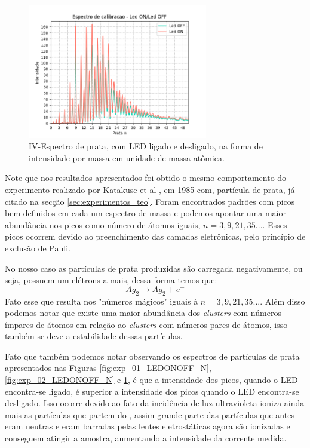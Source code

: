 \begin{figure}
  \centering  
  \includegraphics[width=0.7\textwidth]{exp_04/LED_ON_Led_OFF_espectro_calib_prata_N_.png}
  \caption{IV-Espectro de prata, com LED ligado e desligado, na forma de intensidade por massa em unidade de massa atômica.}
  \label{fig:exp_04_LEDONOFF_N}
\end{figure}

Note que nos resultados apresentados foi obtido o mesmo comportamento do experimento realizado por Katakuse et al \cite{KATAKUSE1985229}, em 1985 com, partícula de prata, já citado na secção \ref{sec:experimentos_teo}. Foram encontrados padrões com picos bem definidos em cada um espectro de massa e podemos apontar uma maior  abundância nos picos como número de átomos iguais, $n= 3,9,21,35...$. Esses picos ocorrem devido ao preenchimento das camadas eletrônicas, pelo princípio de exclusão de Pauli.

 No nosso caso as partículas de prata produzidas são carregada negativamente, ou seja, possuem um elétrons a mais, dessa forma temos que:
  \begin{equation*}
    Ag_{2} \to Ag_{2} + e^{-}
\end{equation*} 
 Fato esse que resulta nos "números mágicos" iguais à $n= 3,9,21,35...$. Além disso podemos notar que existe uma maior abundância dos \textit{clusters} com números ímpares de átomos em relação ao \textit{clusters} com números pares de átomos, isso também se deve a estabilidade dessas partículas.
 
 Fato que também podemos notar observando os espectros de partículas de prata apresentados nas Figuras \ref{fig:exp_01_LEDONOFF_N}, \ref{fig:exp_02_LEDONOFF_N} e \ref{fig:exp_04_LEDONOFF_N}, é que a intensidade dos picos, quando o LED encontra-se ligado, é superior a intensidade dos picos quando o LED encontra-se desligado. Isso ocorre devido ao fato da incidência de luz ultravioleta ioniza ainda mais as partículas que partem do , assim grande parte das partículas que antes eram neutras e eram barradas pelas lentes eletrostáticas agora são ionizadas e conseguem atingir a amostra, aumentando a intensidade da corrente medida.
 
